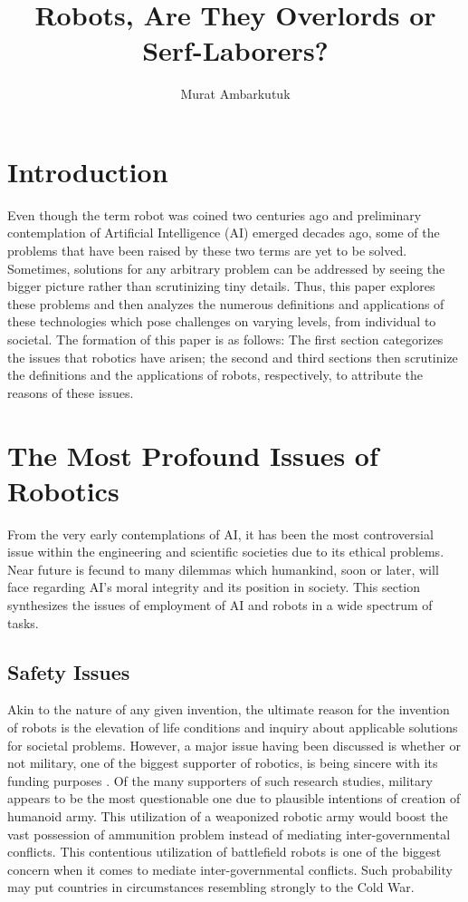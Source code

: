 \documentclass[man]{apa6}
\title{Robots, Are They Overlords or Serf-Laborers?}
\author{Murat Ambarkutuk}
\affiliation{English Language Institute, University of Delaware \\ murata@udel.
edu}
\begin{document}
\maketitle

\section{Introduction}
Even though the term robot was coined two centuries ago and preliminary contemplation of Artificial Intelligence (AI) emerged decades ago, some of the problems that have been raised by these two terms are yet to be solved.
Sometimes, solutions for any arbitrary problem can be addressed by seeing the bigger picture rather than scrutinizing tiny details.
Thus, this paper explores these problems and then analyzes the numerous definitions and applications of these technologies which pose challenges on varying levels, from individual to societal.
The formation of this paper is as follows: The first section categorizes the issues that robotics have arisen; the second and third sections then scrutinize the definitions and the applications of robots, respectively, to attribute the reasons of these issues. 

\section{The Most Profound Issues of Robotics}
From the very early contemplations of AI, it has been the most controversial issue within the engineering and scientific societies due to its ethical problems.
Near future is fecund to many dilemmas which humankind, soon or later, will face regarding AI's moral integrity and its position in society.
This section synthesizes the issues of employment of AI and robots in a wide spectrum of tasks.

\subsection{Safety Issues}
Akin to the nature of any given invention, the ultimate reason for the invention of robots is the elevation of life conditions and inquiry about applicable solutions for societal problems.
However, a major issue having been discussed is whether or not military, one of the biggest supporter of robotics, is being sincere with its funding purposes \cite{gre}.
Of the many supporters of such research studies, military appears to be the most questionable one due to plausible intentions of creation of humanoid army.
This utilization of a weaponized robotic army would boost the vast possession of ammunition problem instead of mediating inter-governmental conflicts.
This contentious utilization of battlefield robots is one of the biggest concern when it comes to mediate inter-governmental conflicts. Such probability may put countries in circumstances resembling strongly to the Cold War. \par
\end{document}
